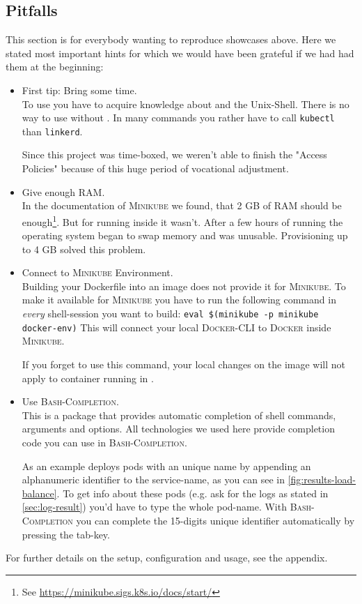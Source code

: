\subsection{Pitfalls}
This section is for everybody wanting to reproduce showcases above.
Here we stated most important hints for which we would have been grateful if we had had them at the beginning:
\begin{itemize}
	\item First tip: Bring some time.\\
	To use \linkerd{} you have to acquire knowledge about \kubernetes{} and the Unix-Shell.
	There is no way to use \linkerd{} without \kubernetes{}.
	In many commands you rather have to call \lstinline|kubectl| than \lstinline|linkerd|.
	
	Since this project was time-boxed, we weren't able to finish the "Access Policies" because of this huge period of vocational adjustment.
	
	\item Give enough RAM.\\
	In the documentation of \textsc{Minikube} we found, that 2 GB of RAM should be enough\footnote{
		See \url{https://minikube.sigs.k8s.io/docs/start/}
	}.
	But for running \linkerd{} inside it wasn't. 
	After a few hours of running the operating system began to swap memory and \kubernetes{} was unusable. 
	Provisioning up to 4 GB solved this problem.

	\item Connect to \textsc{Minikube} Environment.\\
	Building your Dockerfile into an image does not provide it for \textsc{Minikube}.
	To make it available for \textsc{Minikube} you have to run the following command in \textit{every} shell-session you want to build:
	\lstinline|eval $(minikube -p minikube docker-env)|
	This will connect your local \textsc{Docker}-CLI to \textsc{Docker} inside \textsc{Minikube}.
	
	If you forget to use this command, your local changes on the image will not apply to container running in \kubernetes{}.

	\item Use \textsc{Bash-Completion}.\\
	This is a package that provides automatic completion of shell commands, arguments and options.
	All technologies we used here provide completion code you can use in \textsc{Bash-Completion}.
	
	As an example \kubernetes{} deploys pods with an unique name by appending an alphanumeric identifier to the service-name, as you can see in \autoref{fig:results-load-balance}.
	To get info about these pods (e.g. ask for the logs as stated in \autoref{sec:log-result}) you'd have to type the whole pod-name.
	With \textsc{Bash-Completion} you can complete the 15-digits unique identifier automatically by pressing the tab-key.
	
\end{itemize}

For further details on the setup, configuration and usage, see the appendix.


